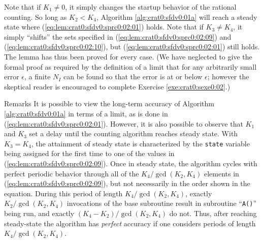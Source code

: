 \begin{vworklemmaproof}
Note that if $K_1 \neq 0$, it simply changes the startup
behavior of the rational counting.  So long as $K_2 < K_4$,
Algorithm \ref{alg:crat0:sfdv0:01a} will reach a steady state where 
(\ref{eq:lem:crat0:sfdv0:sprc0:02:01}) holds.
Note that if $K_3 \neq K_4$, it simply ``shifts'' the sets
specified in (\ref{eq:lem:crat0:sfdv0:sprc0:02:09})
and (\ref{eq:lem:crat0:sfdv0:sprc0:02:10}), but
(\ref{eq:lem:crat0:sfdv0:sprc0:02:01}) still holds.  
The lemma has thus been proved
for every case.  (We have neglected to give
the formal proof as required by the definition of a limit that
for any arbitrarily small error $\epsilon$, a 
finite $N_I$ can be found so that
the error is at or below $\epsilon$; however the skeptical reader
is encouraged to complete Exercise \ref{exe:crat0:sexe0:02}.)
\end{vworklemmaproof}
\begin{vworklemmaparsection}{Remarks}
It is possible to view the long-term accuracy of 
Algorithm \ref{alg:crat0:sfdv0:01a} in terms of a limit, as is done in
(\ref{eq:lem:crat0:sfdv0:sprc0:02:01}).  However, it is also
possible to observe that $K_1$ and $K_3$ set a delay until
the counting algorithm reaches steady state.  
With $K_3=K_4$, the attainment of 
steady state is characterized by the \texttt{state} variable
being assigned for the first time to one of the values in 
(\ref{eq:lem:crat0:sfdv0:sprc0:02:09}).  Once in steady state,
the algorithm cycles with perfect periodic behavior through all of the 
$K_4/\gcd(K_2,K_4)$ elements in 
(\ref{eq:lem:crat0:sfdv0:sprc0:02:09}), but not necessarily in
the order shown in the equation.  
During this period of length $K_4/\gcd(K_2,K_4)$,
exactly $K_2/\gcd(K_2,K_4)$ invocations of the base
subroutine result in
subroutine ``\texttt{A()}'' being run, and exactly 
$(K_4-K_2)/\gcd(K_2,K_4)$ do not.  Thus, after reaching steady-state the
algorithm has \emph{perfect} accuracy if one considers periods of
length $K_4/\gcd(K_2,K_4)$.
\end{vworklemmaparsection}

